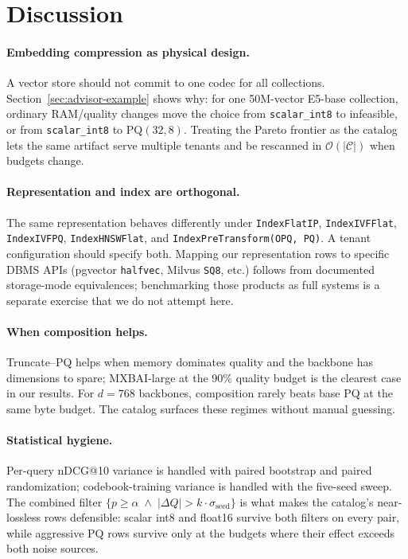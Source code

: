 \documentclass[sigconf]{acmart}
\makeatletter
\newcommand{\ndcg}{nDCG@10}
\makeatother
\begin{document}
\section{Discussion}
\label{sec:discussion}

\paragraph{Embedding compression as physical design.}
A vector store should not commit to one codec for all collections. Section~\ref{sec:advisor-example} shows why: for one 50M-vector E5-base collection, ordinary RAM/quality changes move the choice from \texttt{scalar\_int8} to infeasible, or from \texttt{scalar\_int8} to $\mathrm{PQ}(32,8)$. Treating the Pareto frontier as the catalog lets the same artifact serve multiple tenants and be rescanned in $\mathcal{O}(|\mathcal{C}|)$ when budgets change.

\paragraph{Representation and index are orthogonal.}
The same representation behaves differently under \texttt{IndexFlatIP}, \texttt{IndexIVFFlat}, \texttt{IndexIVFPQ}, \texttt{IndexHNSWFlat}, and \texttt{IndexPreTransform(OPQ,\,PQ)}. A tenant configuration should specify both. Mapping our representation rows to specific DBMS APIs (pgvector \texttt{halfvec}, Milvus \texttt{SQ8}, etc.) follows from documented storage-mode equivalences; benchmarking those products as full systems is a separate exercise that we do not attempt here.

\paragraph{When composition helps.}
Truncate--PQ helps when memory dominates quality and the backbone has dimensions to spare; MXBAI-large at the 90\% quality budget is the clearest case in our results. For $d{=}768$ backbones, composition rarely beats base PQ at the same byte budget. The catalog surfaces these regimes without manual guessing.

\paragraph{Statistical hygiene.}
Per-query \ndcg{} variance is handled with paired bootstrap and paired randomization; codebook-training variance is handled with the five-seed sweep. The combined filter $\{p \ge \alpha \;\land\; |\Delta Q| > k \cdot \sigma_{\text{seed}}\}$ is what makes the catalog's near-lossless rows defensible: scalar int8 and float16 survive both filters on every pair, while aggressive PQ rows survive only at the budgets where their effect exceeds both noise sources.
\end{document}
